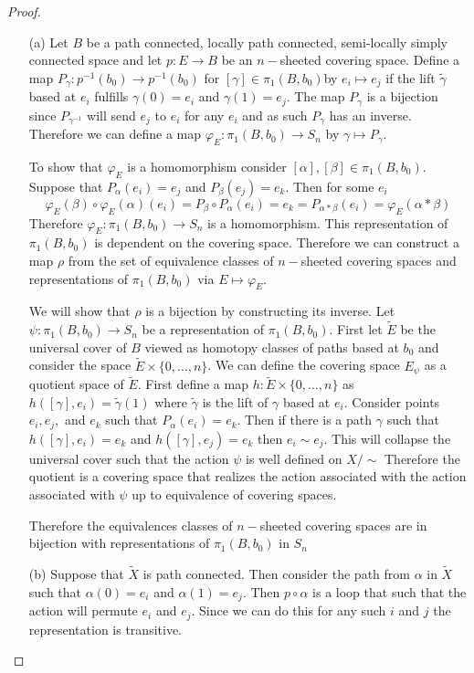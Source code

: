 \documentclass[10pt]{article}
\newcommand{\wt}[1]{\widetilde{#1}}
\theoremstyle{plain}
\theoremstyle{remark}
\begin{document}
\begin{proof}\ \\
  \begin{itemize}
  \item[(a)] Let $B$ be a path connected, locally path connected,
    semi-locally simply connected space and let $p:E\rightarrow B$ be an $n-$sheeted
    covering space. Define a map $P_\gamma:p^{-1}(b_0)\rightarrow p^{-1}(b_0)$ for
    $[\gamma]\in\pi_1(B,b_0)$by $e_i\mapsto e_j$
    if the lift $\wt{\gamma}$ based at $e_i$ fulfills $\gamma(0)=e_i$ and $\gamma(1)=e_j$.
    The map $P_\gamma$ is a bijection since $P_{\gamma^{-1}}$ will send $e_j$ to $e_i$
    for any $e_i$ and as such $P_\gamma$ has an inverse. Therefore we can
    define a map $\varphi_E:\pi_1(B,b_0)\rightarrow S_n$ by $\gamma\mapsto P_\gamma$.
    
    To show that $\varphi_E$ is a homomorphism consider $[\alpha],[\beta]\in\pi_1(B,b_0)$.
    Suppose that $P_\alpha(e_i)=e_j$ and $P_\beta(e_j)=e_k$. Then for some $e_i$
    \[ \varphi_E(\beta)\circ\varphi_E(\alpha)(e_i)=P_\beta\circ P_\alpha(e_i)=e_k=P_{\alpha*\beta}(e_i)=\varphi_E(\alpha*\beta)\]
    Therefore $\varphi_E:\pi_1(B,b_0)\rightarrow S_n$ is a homomorphism. This representation
    of $\pi_1(B,b_0)$ is dependent on the covering space. Therefore we can
    construct a map $\rho$ from the set of equivalence classes of $n-$sheeted
    covering spaces and representations of $\pi_1(B,b_0)$ via
    $E\mapsto \varphi_E$.

    We will show that $\rho$ is a bijection by constructing its inverse.
    Let $\psi:\pi_1(B,b_0)\rightarrow S_n$ be a representation of $\pi_1(B,b_0)$. First
    let $\wt{E}$ be the universal cover of $B$ viewed as homotopy
    classes of paths based at $b_0$ and consider the space
    $\wt{E}\times \{0,\ldots,n\}$. We can define the covering space
    $E_\psi$ as a quotient space of $\wt{E}$. First define a
    map $h:\wt{E}\times\{0,\ldots,n\}$ as $h([\gamma],e_i)=\wt{\gamma}(1)$ where
    $\wt{\gamma}$ is the lift of $\gamma$ based at $e_i$. Consider points
    $e_i,e_j,$ and $e_k$ such that $P_\alpha(e_i)=e_k$. Then if
    there is a path $\gamma$ such that $h([\gamma],e_i)=e_k$
    and $h([\gamma],e_j)=e_k$ then $e_i\sim e_j$. This will collapse
    the universal cover such that the action $\psi$ is well defined
    on $X/\sim$ Therefore the quotient is a covering space that
    realizes the action associated with the action associated
    with $\psi$ up to equivalence of covering spaces.

    Therefore the equivalences classes of $n-$sheeted covering
    spaces are in bijection with representations of $\pi_1(B,b_0)$
    in $S_n$
  \item[(b)] Suppose that $\wt{X}$ is path connected. Then
    consider the path from $\alpha$ in $\wt{X}$ such that
    $\alpha(0)=e_i$ and $\alpha(1)=e_j$. Then $p\circ\alpha$ is a loop that
    such that the action will permute $e_i$ and $e_j$.
    Since we can do this for any such $i$ and $j$
    the representation is transitive.


\end{itemize}
\end{proof}
\end{document}
